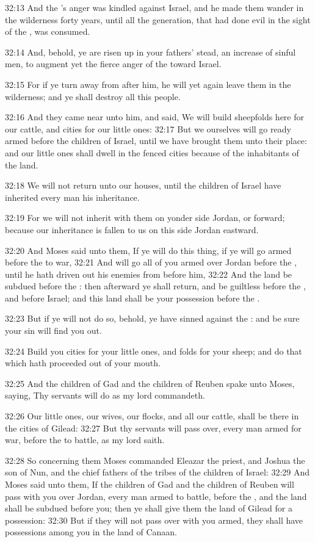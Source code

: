 32:13 And the \LORD's anger was kindled against Israel, and he made them wander in the wilderness forty years, until all the generation, that had done evil in the sight of the \LORD, was consumed.

32:14 And, behold, ye are risen up in your fathers' stead, an increase of sinful men, to augment yet the fierce anger of the \LORD toward Israel.

32:15 For if ye turn away from after him, he will yet again leave them in the wilderness; and ye shall destroy all this people.

32:16 And they came near unto him, and said, We will build sheepfolds here for our cattle, and cities for our little ones: 32:17 But we ourselves will go ready armed before the children of Israel, until we have brought them unto their place: and our little ones shall dwell in the fenced cities because of the inhabitants of the land.

32:18 We will not return unto our houses, until the children of Israel have inherited every man his inheritance.

32:19 For we will not inherit with them on yonder side Jordan, or forward; because our inheritance is fallen to us on this side Jordan eastward.

32:20 And Moses said unto them, If ye will do this thing, if ye will go armed before the \LORD to war, 32:21 And will go all of you armed over Jordan before the \LORD, until he hath driven out his enemies from before him, 32:22 And the land be subdued before the \LORD: then afterward ye shall return, and be guiltless before the \LORD, and before Israel; and this land shall be your possession before the \LORD.

32:23 But if ye will not do so, behold, ye have sinned against the \LORD: and be sure your sin will find you out.

32:24 Build you cities for your little ones, and folds for your sheep; and do that which hath proceeded out of your mouth.

32:25 And the children of Gad and the children of Reuben spake unto Moses, saying, Thy servants will do as my lord commandeth.

32:26 Our little ones, our wives, our flocks, and all our cattle, shall be there in the cities of Gilead: 32:27 But thy servants will pass over, every man armed for war, before the \LORD to battle, as my lord saith.

32:28 So concerning them Moses commanded Eleazar the priest, and Joshua the son of Nun, and the chief fathers of the tribes of the children of Israel: 32:29 And Moses said unto them, If the children of Gad and the children of Reuben will pass with you over Jordan, every man armed to battle, before the \LORD, and the land shall be subdued before you; then ye shall give them the land of Gilead for a possession: 32:30 But if they will not pass over with you armed, they shall have possessions among you in the land of Canaan.

